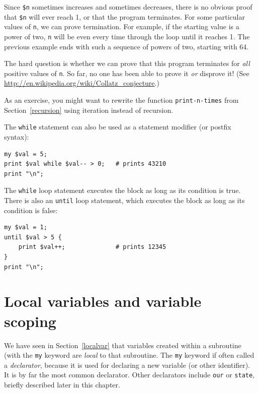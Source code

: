 Since {\tt \$n} sometimes increases and sometimes decreases, there is no
obvious proof that {\tt \$n} will ever reach 1, or that the program
terminates.  For some particular values of {\tt n}, we can prove
termination.  For example, if the starting value is a power of two,
{\tt n} will be even every time through the loop
until it reaches 1. The previous example ends with such a sequence
of powers of two, starting with 64.

The hard question is whether we can prove that this program terminates
for {\em all} positive values of {\tt n}.  So far, no one has
been able to prove it {\em or} disprove it!  (See
\url{http://en.wikipedia.org/wiki/Collatz_conjecture}.)

As an exercise, you might want to rewrite the function 
\verb"print-n-times" from Section~\ref{recursion} using 
iteration instead of recursion.

The {\tt while} statement can also be used as a statement modifier (or postfix syntax):

\begin{verbatim}
my $val = 5;
print $val while $val-- > 0;   # prints 43210
print "\n";
\end{verbatim}

The {\tt while} loop statement executes the block as long as 
its condition is true. There is also an {\tt until} loop 
statement, which executes the block as long as its condition 
is false:

\begin{verbatim}
my $val = 1;
until $val > 5 {
    print $val++;              # prints 12345
}
print "\n";
\end{verbatim}

\section{Local variables and variable scoping}

We have seen in Section~\ref{localvar} that variables created 
within a subroutine (with the {\tt my} keyword are \emph{local} 
to that subroutine. The {\tt my} 
keyword if often called a \emph{declarator}, because it 
is used for declaring a new variable (or other identifier). 
It is by far the most common declarator. Other declarators 
include {\tt our} or {\tt state}, briefly described later 
in this chapter. 

